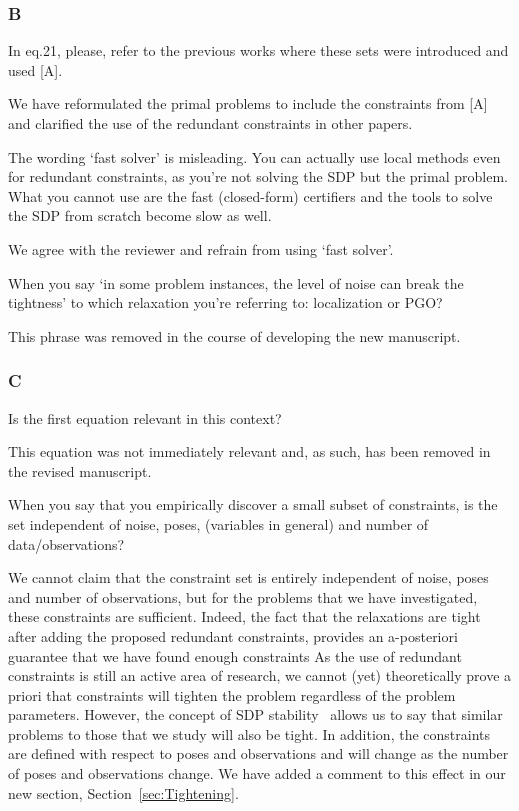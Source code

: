 \subsubsection*{B}
In eq.21, please, refer to the previous works where these sets were introduced and used [A]. 
\begin{response} 
    We have reformulated the primal problems to include the constraints from [A] and clarified the use of the redundant constraints in other papers.  
\end{response}

The wording `fast solver' is misleading. You can actually use local methods even for redundant constraints, as you're not solving the SDP but the primal problem. What you cannot use are the fast (closed-form) certifiers and the tools to solve the SDP from scratch become slow as well. 
\begin{response}
We agree with the reviewer and refrain from using `fast solver'. 
\end{response}

When you say ‘in some problem instances, the level of noise can break the tightness’ to which relaxation you’re referring to: localization or PGO? 
\begin{response}
This phrase was removed in the course of developing the new manuscript.
\end{response}

\subsubsection*{C}
Is the first equation relevant in this context?
\begin{response}
This equation was not immediately relevant and, as such, has been removed in the revised manuscript.
\end{response}

When you say that you empirically discover a small subset of constraints, is the set independent of noise, poses, (variables in general) and number of data/observations? 
\begin{response}
We cannot claim that the constraint set is entirely independent of noise, poses and number of observations, but for the problems that we have investigated, these constraints are sufficient. 
Indeed, the fact that the relaxations are tight after adding the proposed redundant constraints, provides an a-posteriori guarantee that we have found enough constraints
As the use of redundant constraints is still an active area of research, we cannot (yet) theoretically prove a priori that constraints will tighten the problem regardless of the problem parameters. However, the concept of SDP stability~\cite{cifuentesLocalStabilitySemidefinite2022} allows us to say that similar problems to those that we study will also be tight. In addition, the constraints are defined with respect to poses and observations and will change as the number of poses and observations change. We have added a comment to this effect in our new section, Section~\ref{sec:Tightening}.
\end{response}

